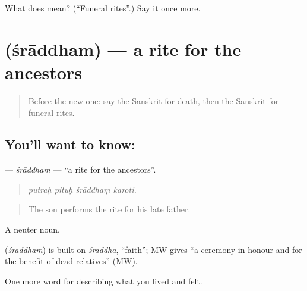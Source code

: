 \begin{tcolorbox}[breakable,colback=teal!4,colframe=teal!35!black,title={Before you move on}]
What does  mean? (\textquotedblleft{}Funeral rites\textquotedblright{}.) Say it once more.
\end{tcolorbox}
\section[\texorpdfstring{\sk{श्राद्धम्} (śrāddham)}{श्राद्धम् (śrāddham)}]{ (śrāddham) — a rite for the ancestors}

\label{lesson:SA-C491-sraddham}



\begin{quote}
Before the new one: say the Sanskrit for death, then the Sanskrit for funeral rites.
\end{quote}

\subsection*{You'll want to know: }
\textbf{} — \emph{śrāddham} — \textquotedblleft{}a rite for the ancestors\textquotedblright{}.

\begin{quote}
   
\end{quote}

\begin{quote}
\emph{putraḥ pituḥ śrāddhaṃ karoti.}
\end{quote}

\begin{quote}
The son performs the rite for his late father.
\end{quote}

A neuter noun.

\begin{cousinweb}
\textbf{} (\emph{śrāddham}) is built on \emph{śraddhā}, \textquotedblleft{}faith\textquotedblright{}; MW gives \textquotedblleft{}a ceremony in honour and for the benefit of dead relatives\textquotedblright{} (MW).
\end{cousinweb}

\begin{grammarlens}[title={What you've built}]
One more word for describing what you lived and felt.
\end{grammarlens}

